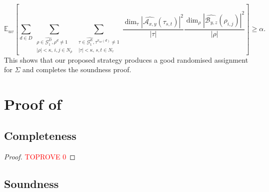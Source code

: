 \documentclass[a4paper,11pt]{article}
\theoremstyle{definition}
\newcommand{\ex}[1]{\mathbb{E}_{#1}}
\newcommand{\gr}{\mathscr{G}}
\newcommand{\A}{\mathcal{A}}
\newcommand{\B}{\mathcal{B}}
\begin{document}
\begin{equation*}
\ex{uv}\left[
\sum_{d\in D}
\sum_{\substack{\rho \in \widehat{\gr_1^D}, \rho^d \neq 1\\
|\rho| < \kappa, \, i,j \in N_\rho
}}
\sum_{\substack{\tau \in \widehat{\gr_1^E}, \tau^{\pi_{uv}(d)} \neq 1\\
|\tau| < \kappa, \, s,t\in N_\tau
}}
\frac{\dim_\tau \left\vert \widehat{\A_{x,y}}(\tau_{s,t})\right\vert^2}{|\tau|}
\frac{\dim_\rho\left\vert \widehat{\B_{y,z}}(\rho_{i,j})\right\vert^2}{|\rho|} \right] \geq \alpha.
\end{equation*} 
This shows that our proposed strategy produces a good randomised assignment for $\Sigma$ and completes the soundness proof. 


\section{Proof of~} \label{sec:proof-main}


\subsection{Completeness} \label{sec:completeness}


\begin{proof}\textcolor{red}{TOPROVE 0}\end{proof}




\subsection{Soundness}
\label{sec:soundness}
\end{document}
